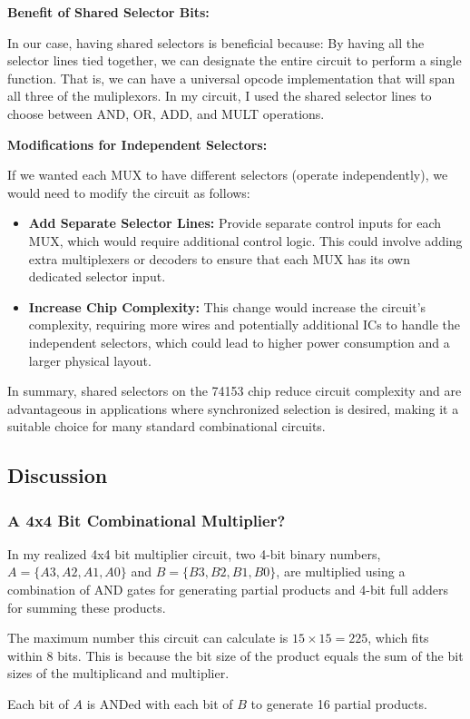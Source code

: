 \documentclass[12pt]{article}
\begin{document}
\textbf{Benefit of Shared Selector Bits:}

In our case, having shared selectors is beneficial because:
By having all the selector lines tied together, we can designate the entire circuit to perform a single function. That is, we can have a universal opcode implementation that will span all three of the muliplexors. In my circuit, I used the shared selector lines to choose between AND, OR, ADD, and MULT operations.


\textbf{Modifications for Independent Selectors:}

If we wanted each MUX to have different selectors (operate independently), we would need to modify the circuit as follows:
\begin{itemize}
	\item \textbf{Add Separate Selector Lines:} Provide separate control inputs for each MUX, which would require additional control logic. This could involve adding extra multiplexers or decoders to ensure that each MUX has its own dedicated selector input.
	\item \textbf{Increase Chip Complexity:} This change would increase the circuit’s complexity, requiring more wires and potentially additional ICs to handle the independent selectors, which could lead to higher power consumption and a larger physical layout.
\end{itemize}
In summary, shared selectors on the 74153 chip reduce circuit complexity and are advantageous in applications where synchronized selection is desired, making it a suitable choice for many standard combinational circuits.
\subsection*{Discussion}
\subsubsection*{A 4x4 Bit Combinational Multiplier?}
In my realized 4x4 bit multiplier circuit, two 4-bit binary numbers, \( A = \{A3, A2, A1, A0\} \) and \( B = \{B3, B2, B1, B0\} \), are multiplied using a combination of AND gates for generating partial products and 4-bit full adders for summing these products.

The maximum number this circuit can calculate is \( 15 \times 15 = 225 \), which fits within 8 bits. This is because the bit size of the product equals the sum of the bit sizes of the multiplicand and multiplier.

Each bit of \( A \) is ANDed with each bit of \( B \) to generate 16 partial products.
\end{document}

